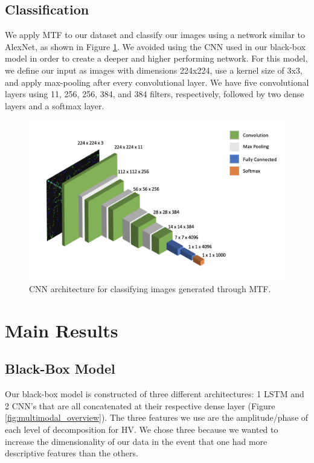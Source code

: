\documentclass{turabian-thesis}
\begin{document}
\section{Classification}
We apply MTF to our dataset and classify our images using a network similar to AlexNet, as shown in Figure \ref{fig:mtf_cnn_model}. We avoided using the CNN used in our black-box model in order to create a deeper and higher performing network. For this model, we define our input as images with dimensions 224x224, use a kernel size of 3x3, and apply max-pooling after every convolutional layer. We have five convolutional layers using 11, 256, 256, 384, and 384 filters, respectively, followed by two dense layers and a softmax layer.
\begin{figure}[h!]
   \begin{center}
      \includegraphics[scale=.7]{../media/2d_cnn.png}
   \end{center}
   \caption{CNN architecture for classifying images generated through MTF.}
   \label{fig:mtf_cnn_model}
\end{figure}



\chapter{Main Results}
\label{chap:results}

\section{Black-Box Model}
Our black-box model is constructed of three different architectures: 1 LSTM and 2 CNN’s that are all concatenated at their respective dense layer (Figure \ref{fig:multimodal_overview}). The three features we use are the amplitude/phase of each level of decomposition for HV. We chose three because we wanted to increase the dimensionality of our data in the event that one had more descriptive features than the others. 
\end{document}
